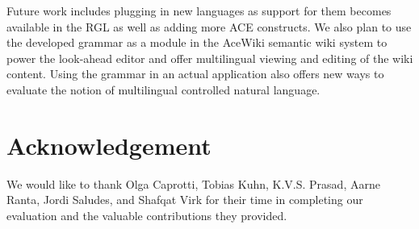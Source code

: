 \documentclass[a4paper]{article}
\begin{document}
Future work includes plugging in new languages as support for them becomes
available in the RGL as well as adding more ACE constructs. We also plan
to use the developed grammar as a module in the AceWiki semantic wiki system
to power the look-ahead editor and offer multilingual viewing and editing
of the wiki content. Using the grammar in an actual application also offers
new ways to evaluate the notion of multilingual controlled natural language.

\section*{Acknowledgement}

We would like to thank
Olga Caprotti,
Tobias Kuhn,
K.V.S. Prasad,
Aarne Ranta,
Jordi Saludes,
and
Shafqat Virk
for their time in completing our
evaluation and the valuable contributions they provided.



%
\end{document}
